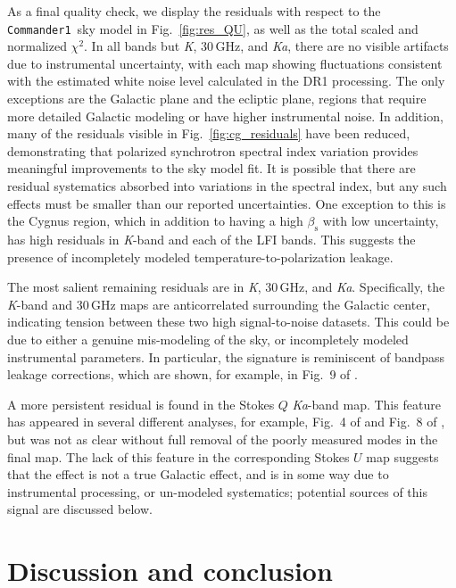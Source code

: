 \documentclass[twocolumn]{../../common/aa}
\def\commanderone{\texttt{Commander1}}
\newcommand{\K}[0]{\textit K}
\newcommand{\Ka}[0]{\textit{Ka}}
\begin{document}
As a final quality check, we display the residuals with respect to the \commanderone\ sky model in Fig.~\ref{fig:res_QU}, as well as the total scaled and normalized $\chi^2$. In all bands but \K, 30\,GHz, and \Ka, there are no visible artifacts due to instrumental uncertainty, with each map showing fluctuations consistent with the estimated white noise level calculated in the DR1 processing. The only exceptions are the Galactic plane and the ecliptic plane, regions that require more detailed Galactic modeling or have higher instrumental noise. In addition, many of the residuals visible in Fig.~\ref{fig:cg_residuals} have been reduced, demonstrating that polarized synchrotron spectral index variation provides meaningful improvements to the sky model fit. It is possible that there are residual systematics absorbed into variations in the spectral index, but any such effects must be smaller than our reported uncertainties.
%
One exception to this is the Cygnus region, which in addition to having a high $\beta_\mathrm s$ with low uncertainty, has high residuals in \K-band and each of the LFI bands. This suggests the presence of incompletely modeled temperature-to-polarization leakage.

The most salient remaining residuals are in \K, 30\,GHz, and \Ka. Specifically, the \K-band and 30\,GHz maps are anticorrelated surrounding the Galactic center, indicating tension between these two high signal-to-noise datasets. This could be due to either a genuine mis-modeling of the sky, or  incompletely modeled instrumental parameters. In particular, the signature is reminiscent of bandpass leakage corrections, which are shown, for example, in Fig.~9 of \citet{bp09}.

A more persistent residual is found in the Stokes $Q$ \Ka-band map. This feature has appeared in several different analyses, for example, Fig.~4 of \citet{bp14} and Fig.~8 of \citet{weiland:2022}, but was not as clear without full removal of the poorly measured modes in the final map. The lack of this feature in the corresponding Stokes $U$ map suggests that the effect is not a true Galactic effect, and is in some way due to instrumental processing, or un-modeled systematics; potential sources of this signal are discussed below.






\section{Discussion and conclusion}
\label{sec:conclusion}
\end{document}
